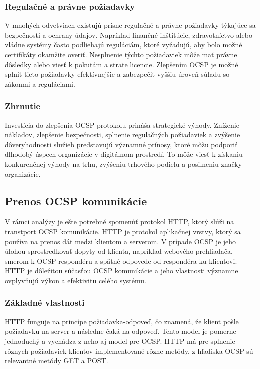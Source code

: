 \documentclass[12pt, twoside]{book}
\begin{document}
\subsubsection{Regulačné a právne požiadavky}
V mnohých odvetviach existujú prísne regulačné a právne požiadavky týkajúce sa bezpečnosti a ochrany údajov. Napríklad finančné inštitúcie, zdravotníctvo alebo vládne systémy často podliehajú reguláciám, ktoré vyžadujú, aby bolo možné certifikáty okamžite overiť. Nesplnenie týchto požiadaviek môže mať právne dôsledky alebo viesť k pokutám a strate licencie. Zlepšením OCSP je možné splniť tieto požiadavky efektívnejšie a zabezpečiť vyššiu úroveň súladu so zákonmi a reguláciami.

\subsubsection{Zhrnutie}
Investícia do zlepšenia OCSP protokolu prináša strategické výhody. Zníženie nákladov, zlepšenie bezpečnosti, splnenie regulačných požiadaviek a zvýšenie dôveryhodnosti služieb predstavujú významné prínosy, ktoré môžu podporiť dlhodobý úspech organizácie v digitálnom prostredí. To môže viesť k získaniu konkurenčnej výhody na trhu, zvýšeniu trhového podielu a posilneniu značky organizácie.


\subsection{Prenos OCSP komunikácie}
V rámci analýzy je ešte potrebné spomenúť protokol HTTP, ktorý slúži na transtport OCSP komunikácie. HTTP je protokol aplikačnej vrstvy, ktorý sa používa na prenos dát medzi klientom a serverom. V prípade OCSP je jeho úlohou sprostredkovať dopyty od klienta, napríklad webového prehliadača, smerom k OCSP respondéru a spätné odpovede od respondéra ku klientovi. HTTP je dôležitou súčasťou OCSP komunikácie a jeho vlastnosti významne ovplyvňujú výkon a efektivitu celého systému.

\subsubsection{Základné vlastnosti}
HTTP funguje na princípe požiadavka-odpoveď, čo znamená, že klient pošle požiadavku na server a následne čaká na odpoveď. Tento model je pomerne jednoduchý a vychádza z neho aj model pre OCSP. HTTP má pre splnenie rôznych požiadaviek klientov implementované rôzne metódy, z hľadiska OCSP sú relevantné metódy GET a POST.
\end{document}
